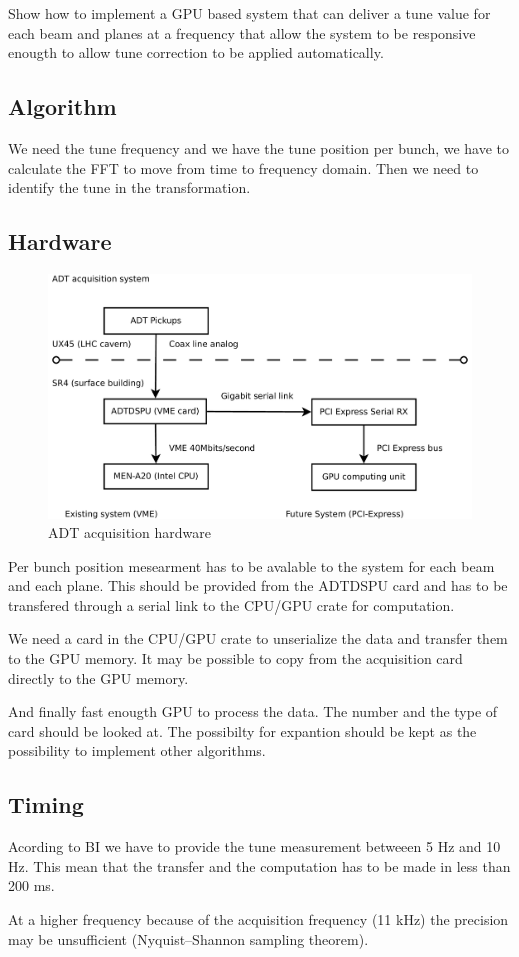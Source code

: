 Show how to implement a GPU based system that can deliver a tune value for each beam and planes at a frequency that allow the system to be responsive enougth to allow tune correction to be applied automatically. 

   \subsection{Algorithm}

   We need the tune frequency and we have the tune position per bunch, we have to calculate the FFT to move from time to frequency domain. Then we need to identify the tune in the transformation.

   \subsection{Hardware}

   \begin{figure}[H]
	\caption{ADT acquisition hardware}
	\centering
	\includegraphics[scale=0.3]{acquisition.pdf}
	\end{figure}

   Per bunch position mesearment has to be avalable to the system for each beam and each plane. This should be provided from the ADTDSPU card and has to be transfered through a serial link to the CPU/GPU crate for computation.

   We need a card in the CPU/GPU crate to unserialize the data and transfer them to the GPU memory. It may be possible to copy from the acquisition card directly to the GPU memory.

   And finally fast enougth GPU to process the data. The number and the type of card should be looked at. The possibilty for expantion should be kept as the possibility to implement other algorithms.
   
   \subsection{Timing}

   Acording to \gls{BI} we have to provide the tune measurement betweeen 5 Hz and 10 Hz. This mean that the transfer and the computation has to be made in less than 200 ms.

   At a higher frequency because of the acquisition frequency (11 kHz) the precision may be unsufficient (Nyquist–Shannon sampling theorem).